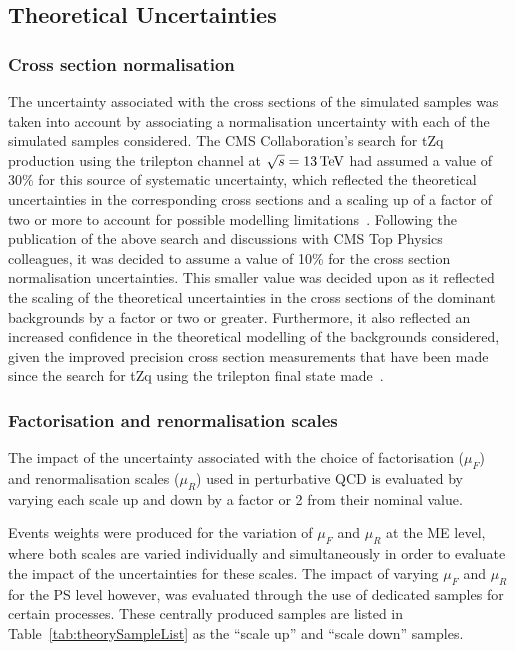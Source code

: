 \newpage

\subsection{Theoretical Uncertainties}\label{sec:theorySysts}
\subsubsection{Cross section normalisation}
The uncertainty associated with the cross sections of the simulated samples was taken into account by associating a normalisation uncertainty with each of the simulated samples considered.
The CMS Collaboration's search for tZq production using the trilepton channel at $\sqrt{s} = 13\,\text{Te\hspace{-.08em}V}$ had assumed a value of 30\% for this source of systematic uncertainty, which reflected the theoretical uncertainties in the corresponding cross sections and a scaling up of a factor of two or more to account for possible modelling limitations~\cite{Sirunyan:2017nbr}.
Following the publication of the above search and discussions with CMS Top Physics colleagues, it was decided to assume a value of 10\% for the cross section normalisation uncertainties.
This smaller value was decided upon as it reflected the scaling of the theoretical uncertainties in the cross sections of the dominant backgrounds by a factor or two or greater.
Furthermore, it also reflected an increased confidence in the theoretical modelling of the backgrounds considered, given the improved precision cross section measurements that have been made since the search for tZq using the trilepton final state made~\cite{combineNick,crossSectionSystematics}. 


\subsubsection{Factorisation and renormalisation scales}
The impact of the uncertainty associated with the choice of factorisation ($\mu_{F}$) and renormalisation scales ($\mu_{R}$) used in perturbative QCD is evaluated by varying each scale up and down by a factor or 2 from their nominal value.

Events weights were produced for the variation of $\mu_{F}$ and $\mu_{R}$ at the ME level, where both scales are varied individually and simultaneously in order to evaluate the impact of the uncertainties for these scales.
The impact of varying $\mu_{F}$ and $\mu_{R}$ for the PS level however, was evaluated through the use of dedicated samples for certain processes.
These centrally produced samples are listed in Table~\ref{tab:theorySampleList} as the ``scale up'' and ``scale down'' samples. 

